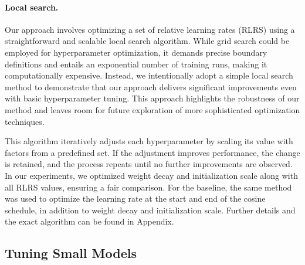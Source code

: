 \documentclass{article}
\theoremstyle{plain}
\theoremstyle{definition}
\theoremstyle{remark}
\begin{document}
    \paragraph{Local search.} Our approach involves optimizing a set of relative learning rates (RLRS) using a straightforward and scalable local search algorithm. While grid search could be employed for hyperparameter optimization, it demands precise boundary definitions and entails an exponential number of training runs, making it computationally expensive. Instead, we intentionally adopt a simple local search method to demonstrate that our approach delivers significant improvements even with basic hyperparameter tuning. This approach highlights the robustness of our method and leaves room for future exploration of more sophisticated optimization techniques.
    
    This algorithm iteratively adjusts each hyperparameter by scaling its value with factors from a predefined set. If the adjustment improves performance, the change is retained, and the process repeats until no further improvements are observed. In our experiments, we optimized weight decay and initialization scale along with all RLRS values, ensuring a fair comparison. For the baseline, the same method was used to optimize the learning rate at the start and end of the cosine schedule, in addition to weight decay and initialization scale. Further details and the exact algorithm can be found in Appendix. 
    
    
    
    
    
    \subsection{Tuning Small Models}
    
\end{document}
